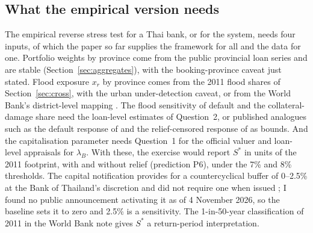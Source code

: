\subsection{What the empirical version needs}

The empirical reverse stress test for a Thai bank, or for the system, needs four inputs, of which the paper so far supplies the framework for all and the data for one. Portfolio weights by province come from the public provincial loan series and are stable (Section~\ref{sec:aggregates}), with the booking-province caveat just stated. Flood exposure $x_r$ by province comes from the 2011 flood shares of Section~\ref{sec:cross}, with the urban under-detection caveat, or from the World Bank's district-level mapping \citep{worldbank2026ccdrfin}. The flood sensitivity of default and the collateral-damage share need the loan-level estimates of Question~2, or published analogues such as the default response of \citet{albertazzi2026physical} and the relief-censored response of \citet{chitchumnong2025physical} as bounds. And the capitalisation parameter needs Question~1 for the official valuer and loan-level appraisals for $\lambda_B$. With these, the exercise would report $S^*$ in units of the 2011 footprint, with and without relief (prediction P6), under the 7\% and 8\% thresholds. The capital notification provides for a countercyclical buffer of 0--2.5\% at the Bank of Thailand's discretion and did not require one when issued \citep{bot2012capital}; I found no public announcement activating it as of 4 November 2026, so the baseline sets it to zero and 2.5\% is a sensitivity. The 1-in-50-year classification of 2011 in the World Bank note gives $S^*$ a return-period interpretation.
